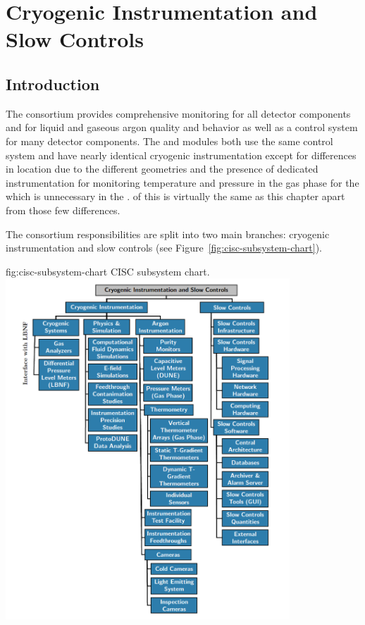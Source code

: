 \chapter{Cryogenic Instrumentation and Slow Controls}
\label{ch:dp-cisc}


\section{Introduction} 

The  consortium provides comprehensive monitoring for all detector components and for liquid and gaseous argon quality and behavior as well as a control system for many detector components.
The  and  modules both use the same control
system and have nearly identical cryogenic instrumentation except
for differences in location due to the different 
geometries and the presence of dedicated instrumentation for
monitoring temperature and pressure in the gas phase for the
 which is unnecessary in the .  
\spchcisc{} of this  is
virtually the same as this chapter apart from those few
differences.

The consortium responsibilities are split into 
two main branches: cryogenic instrumentation and slow controls (see Figure~\ref{fig:cisc-subsystem-chart}). 

\begin{dunefigure}{fig:cisc-subsystem-chart}
  {CISC subsystem chart.}
  \includegraphics[width=0.8\textwidth]{graphics/CISC_scope-v2-dp-zoomed.png}
\end{dunefigure}


